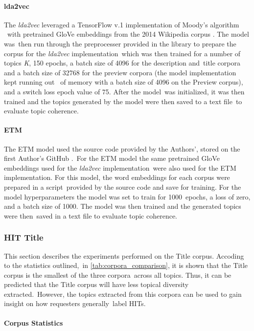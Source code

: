 \documentclass[letterpaper,12pt]{article}
\begin{document}
\paragraph{lda2vec}
The \emph{lda2vec} leveraged a TensorFlow v.1 implementation \cite{lda2vecTF} of Moody's algorithm \
with pretrained GloVe embeddings from the 2014 Wikipedia corpus \cite{pennington2014glove}. The model was\
then run through the preprocesser provided in the library to prepare the corpus for the \emph{lda2vec} implementation\
which was then trained for a number of topics \emph{K}, 150 epochs, a batch size of 4096 for the description and\
title corpora and a batch size of 32768 for the preview corpora (the model implementation kept running out \
of memory with a batch size of 4096 on the Preview corpus), and a switch loss epoch value of 75. After the model\
was initialized, it was then trained and the topics generated by the model were then saved to a text file\
to evaluate topic coherence.

\paragraph{ETM}
The ETM model used the source code provided by the Authors', stored on the first Author's GitHub \cite{etmGithub}.\
For the ETM model the same pretrained GloVe embeddings \cite{pennington2014glove} used for the \emph{lda2vec} implementation\
were also used for the ETM implementation. For this model, the word embeddings for each corpus were prepared in a script\
provided by the source code and save for training. For the model hyperparameters the model was set to train for 1000\
epochs, a loss of zero, and a batch size of 1000. The model was then trained and the generated topics were then\
saved in a text file to evaluate topic coherence.

\subsubsection{HIT Title}
This section describes the experiments performed on the Title corpus. Accoding to the statistics outlined,\
in \ref{tab:corpora_comparison}, it is shown that the Title corpus is the smallest of the three corpora\
across all topics. Thus, it can be predicted that the Title corpus will have less topical diversity extracted.\
However, the topics extracted from this corpora can be used to gain insight on how requesters generally\
label HITs.
\paragraph{Corpus Statistics}
\end{document}
